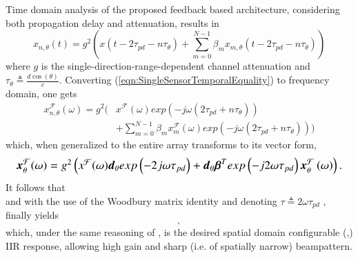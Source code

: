 \ifdefined\DEFIncludeAttenuation
    Time domain analysis of the proposed feedback based architecture, considering both propagation delay and attenuation, results in 
    \begin{equation}
        \label{eqn:SingleSensorTemporalEquality}
        x_{n,\theta}(t) = g^{2}\left(x\left(t-2\tau_{pd}-n\tau_{\theta}\right)+\sum_{m=0}^{N-1}{\beta_{m}x_{m,\theta}(t-2\tau_{pd}-n\tau_{\theta})}\right)
    \end{equation}
    where $g$ is the single-direction-range-dependent channel attenuation and $\tau_{\theta} \triangleq \frac{d\cos\left(\theta\right)}{c}$.
    Converting (\ref{eqn:SingleSensorTemporalEquality}) to frequency domain, one gets
    \begin{equation}
        \begin{split}
            x_{n,\theta}^{\mathcal{F}}(\omega) =
            g^{2}\Bigg( & x^{\mathcal{F}}(\omega)
            exp\left(-j\omega(2\tau_{pd}+n\tau_{\theta})\right)
            \\&+\sum_{m=0}^{N-1}
            {
            \beta_{m}x_{m}^{\mathcal{F}}(\omega)
            exp\left(-j\omega\left(2\tau_{pd}+n\tau_{\theta}\right)\right)
            }\Bigg) 
        \end{split}
    \end{equation} 
    which, when generalized to the entire array transforms to its vector form,
    \begin{equation}
        \resizebox{\linewidth}{!}{
            $
            \vecnot{x}^{\mathcal{F}}_{\theta}(\omega) = 
            g^{2}\left(
            x^{\mathcal{F}}(\omega)\vecnot{d}_{\theta}exp\left(-2j\omega\tau_{pd}\right)
            +
            \vecnot{d}_{\theta}\vecnot{\beta}^{T}exp\left(-j2\omega\tau_{pd}\right)\vecnot{x}_{\theta}^{\mathcal{F}}\left(\omega\right)\right).
            $
        }
    \end{equation}
    It follows that
    $$
    
    $$
    and with the use of the Woodbury matrix identity \cite{woodbury1950inverting} and denoting $\tau\triangleq2\omega\tau_{pd}$ , finally yields
    \begin{equation}
    \label{eqn:GeneralFeedbackTransferFunction}
    ,
    \end{equation}
    which, under the same reasoning of \cite{VanVeenBeamforming:Filtering}, is the desired spatial domain configurable (\vecnot{\alpha},\vecnot{\beta}) IIR response, allowing high gain and sharp (i.e. of spatially narrow) beampattern.
